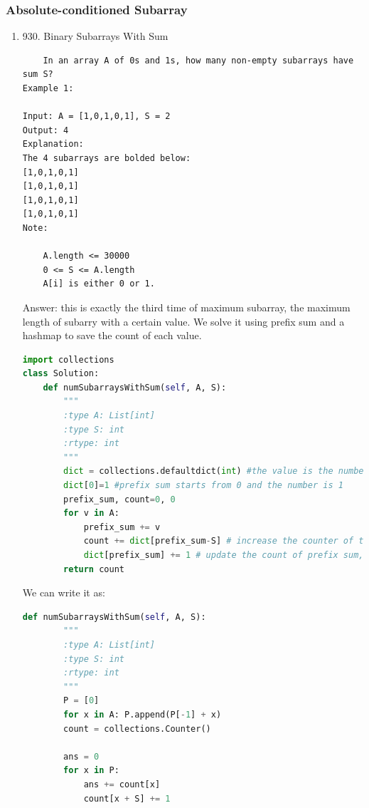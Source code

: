 \documentclass[../specific-algorithms.tex]{subfiles}
\begin{document}
\subsubsection{Absolute-conditioned Subarray}
\begin{enumerate}
    \item 930. Binary Subarrays With Sum
    \begin{lstlisting}
    In an array A of 0s and 1s, how many non-empty subarrays have sum S?
Example 1:

Input: A = [1,0,1,0,1], S = 2
Output: 4
Explanation: 
The 4 subarrays are bolded below:
[1,0,1,0,1]
[1,0,1,0,1]
[1,0,1,0,1]
[1,0,1,0,1]
Note:

    A.length <= 30000
    0 <= S <= A.length
    A[i] is either 0 or 1.
\end{lstlisting}
Answer: this is exactly the third time of maximum subarray, the maximum length of subarry with a certain value. We solve it using prefix sum and a hashmap to save the count of each value. 
\begin{lstlisting}[language=Python]
import collections
class Solution:
    def numSubarraysWithSum(self, A, S):
        """
        :type A: List[int]
        :type S: int
        :rtype: int
        """
        dict = collections.defaultdict(int) #the value is the number of the sum occurs
        dict[0]=1 #prefix sum starts from 0 and the number is 1
        prefix_sum, count=0, 0
        for v in A:
            prefix_sum += v
            count += dict[prefix_sum-S] # increase the counter of the appearing value k, default is 0
            dict[prefix_sum] += 1 # update the count of prefix sum, if it is first time, the default value is 0
        return count
\end{lstlisting}
We can write it as:
\begin{lstlisting}[language=Python]
    def numSubarraysWithSum(self, A, S):
        """
        :type A: List[int]
        :type S: int
        :rtype: int
        """
        P = [0]
        for x in A: P.append(P[-1] + x)
        count = collections.Counter()

        ans = 0
        for x in P:
            ans += count[x]
            count[x + S] += 1


\end{lstlisting}
\end{enumerate}
\end{document}
